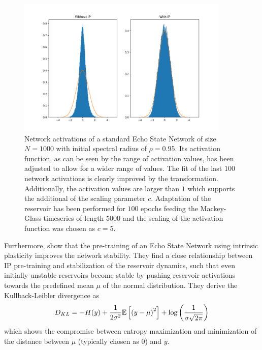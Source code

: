 \begin{figure}
    \begin{center}
    \includegraphics[width=0.9\textwidth]{Plots/IP_KLTANH_sigma1.png}
    \end{center}
    \label{FIG:IPTuning}
    \caption{Network activations of a standard Echo State Network of size $N=1000$ with initial spectral radius of $\rho = 0.95$. Its activation function, as can be seen by the range of activation values, has been adjusted to allow for a wider range of values. The fit of the last $100$ network activations is clearly improved by the transformation. Additionally, the activation values are larger than $1$ which supports the additional of the scaling parameter $c$. Adaptation of the reservoir has been performed for $100$ epochs feeding the Mackey-Glass timeseries of length $5000$ and the scaling of the activation function was chosen as $c=5$.}
\end{figure}

Furthermore, \cite{Koprinkova2011IPandStability} show that the pre-training of an Echo State Network using intrinsic plasticity improves the network stability. They find a close relationship between IP pre-training and stabilization of the reservoir dynamics, such that even initially unstable reservoirs become stable by pushing reservoir activations towards the predefined mean $\mu$ of the normal distribution. They derive the Kullback-Leibler divergence as
\begin{equation}
    D_{KL} = - H(y) + \frac{1}{2\sigma^2}\mathbb{E}\left[ \left(y-\mu\right)^2 \right] + \text{log} \left(\frac{1}{\sigma\sqrt{2\pi}}\right)
\end{equation}
which shows the compromise between entropy maximization and minimization of the distance between $\mu$ (typically chosen as $0$) and $y$.